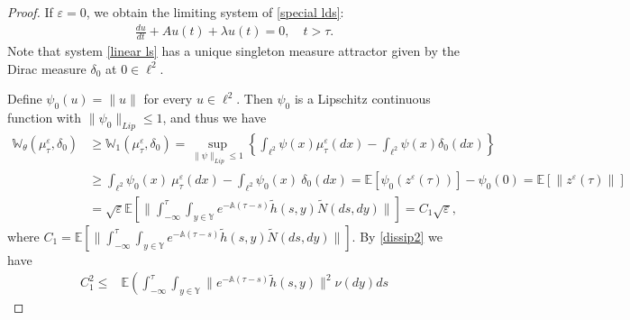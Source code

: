 \documentclass[11pt]{article}
\numberwithin{equation}{section}
\theoremstyle{plain}
\begin{document}
\begin{proof}
 If $\varepsilon = 0$, we obtain
 the limiting system
 of \eqref{special lds}: 
 \begin{align} \label{linear ls}
   \frac{d u}{d t} +   A u(t) + \lambda u(t) = 0, \quad t > \tau.
 \end{align}
 Note that
 system \eqref{linear ls}
 has a unique singleton measure attractor
 given by 
 the Dirac measure $\delta_0$
 at $0 \in \ell^2$.   

 Define $\psi_0 (u) = \| u \| $ for every $u\in \ell^2$.
 Then
 $\psi_0 $ is
 a  Lipschitz continuous  function with $\|\psi_0\|_{Lip} \le 1$, and
 thus  we have
 \begin{align} \label{lowbound}
    \mathbb{W}_\theta (\mu_\tau^\varepsilon, \delta_0)
       & \ge \mathbb{W}_1 (\mu_\tau^\varepsilon, \delta_0)
            = \sup_{\| \psi \|_{Lip} \le 1}
                                     \left\{ \int_{\ell^2} \psi(x) \mu_\tau^\varepsilon(dx) 
                                               - \int_{\ell^2} \psi(x) \delta_0(dx)
                                     \right\}  \nonumber\\
       & \ge \int_{\ell^2} \psi_0 (x) \  \mu_\tau^\varepsilon(dx)
                  - \int_{\ell^2} \psi_0 (x) \  \delta_0(dx)
           = \mathbb{E} \left[ \psi_0 (z^\varepsilon (\tau) ) \right] - \psi_0 (0) 
           = \mathbb{E} \left[ \| z^\varepsilon (\tau) \| \right]  \nonumber \\
       & = \sqrt{\varepsilon}
                  \mathbb{E}
                                   \left[
                                          \| \int_{-\infty}^\tau
                                                \int_{y \in \mathbb{Y} } e^{-\mathbb{A}(\tau-s)} \widetilde{h}(s, y) \widetilde{N}(ds,dy)
                                          \| 
                                   \right]
      =  {C}_1 \sqrt{\varepsilon},
 \end{align}
 where
 $C_1 = \mathbb{E}
                              \left[ \| \int_{-\infty}^\tau
                                           \int_{y \in \mathbb{Y} } e^{-\mathbb{A}(\tau-s)} \widetilde{h}(s, y) \widetilde{N}(ds,dy)
                                     \|
                              \right]
                     $.
 By \eqref{dissip2}  we have
 \begin{align*}
    C_1^2 
   \le & \mathbb{E}
                              \left
                              (   \int_{-\infty}^\tau
                                           \int_{y \in \mathbb{Y} } 
                                           \| e^{-\mathbb{A}(\tau-s)} \widetilde{h}(s, y)\|^2  \nu(dy) ds 

\end{align*}
\end{proof}
\end{document}
